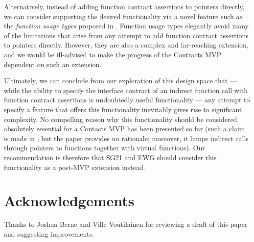 Alternatively, instead of adding function contract assertions to pointers directly, we can consider supporting the desired functionality via a novel feature such as the \emph{function usage types} proposed in \cite{P3271R0}. Function usage types elegantly avoid many of the limitations that arise from any attempt to add function contract assertions to pointers directly. However, they are also a complex and far-reaching extension, and we would be ill-advised to make the progress of the Contracts MVP \cite{P2900R7} dependent on such an extension.

Ultimately, we can conclude from our exploration of this design space that --- while the ability to specify the interface contract of an indirect function call with function contract assertions is undoubtedly useful functionality --- any attempt to specify a feature that offers this functionality inevitably gives rise to significant complexity. No compelling reason why this functionality should be considered absolutely essential for a Contacts MVP has been presented so far (such a claim is  made in \cite{P3173R0}, but the paper provides no rationale; moreover, it lumps indirect calls through pointers to functions together with virtual functions). Our recommendation is therefore that SG21 and EWG should consider this functionality as a post-MVP extension instead.



\section*{Acknowledgements}
Thanks to Joshua Berne and Ville Voutilainen for reviewing a draft of this paper and suggesting improvements.


\pagebreak %


\renewcommand{\addcontentsline}[3]{}%







